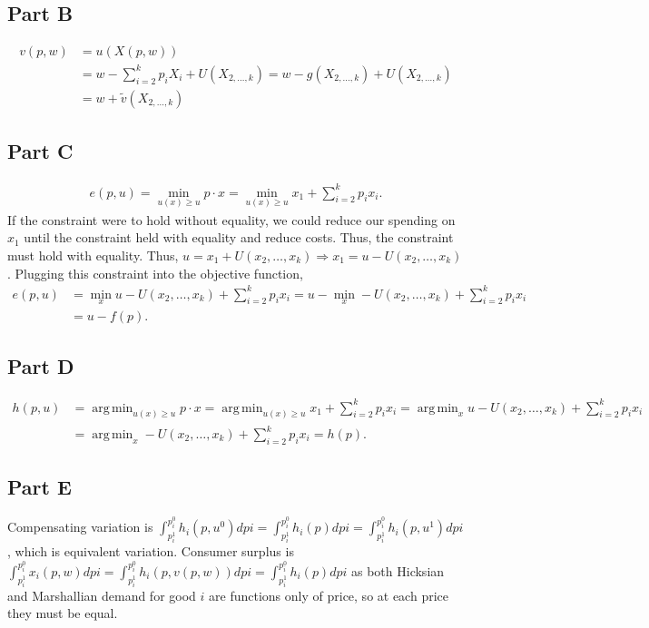 \documentclass[11pt]{article} %
\DeclareMathOperator*{\argmin}{arg\,min}
\begin{document}
\subsection{Part B}
\begin{align*}
v(p,w) &= u(X(p,w)) \\%
&= w - \sum_{i=2}^k p_i X_i+ U(X_{2,\dots,k}) = w - g(X_{2,\dots,k}) +U(X_{2,\dots,k}) \\&= w + \tilde{v}(X_{2,\dots,k})
\end{align*}
\subsection{Part C}
\begin{align*}
e(p,u) = \min_{u(x)\geq u} p \cdot x = \min_{u(x)\geq u} x_1 + \sum_{i=2}^k p_ix_i.
\end{align*}
If the constraint were to hold without equality, we could reduce our spending on $x_1$ until the constraint held with equality and reduce costs. Thus, the constraint must hold with equality. Thus, $u = x_1 +U(x_2,\dots,x_k) \Rightarrow x_1 = u - U(x_2,\dots,x_k)$. Plugging this constraint into the objective function,
\begin{align*}
e(p,u) &= \min_{x} u - U(x_2,\dots,x_k) + \sum_{i=2}^k p_ix_i = u - \min_{x} - U(x_2,\dots,x_k) + \sum_{i=2}^k p_ix_i \\&= u - f(p).
\end{align*}
\subsection{Part D}
\begin{align*}
h(p,u) &= \argmin_{u(x)\geq u} p \cdot x = \argmin_{u(x)\geq u} x_1 + \sum_{i=2}^k p_ix_i = \argmin_{x} u - U(x_2,\dots,x_k) +  \sum_{i=2}^k p_ix_i \\&=  \argmin_{x} - U(x_2,\dots,x_k) +  \sum_{i=2}^k p_ix_i = h(p).
\end{align*}
\subsection{Part E}
Compensating variation is $\int_{p_i^1}^{p_i^0}h_i(p,u^0)dpi = \int_{p_i^1}^{p_i^0}h_i(p)dpi = \int_{p_i^1}^{p_i^0}h_i(p,u^1)dpi$, which is equivalent variation. Consumer surplus is $\int_{p_i^1}^{p_i^0}x_i(p,w)dpi = \int_{p_i^1}^{p_i^0}h_i(p,v(p,w))dpi =  \int_{p_i^1}^{p_i^0}h_i(p)dpi $ as both Hicksian and Marshallian demand for good $i$ are functions only of price, so at each price they must be equal.%
\end{document}
